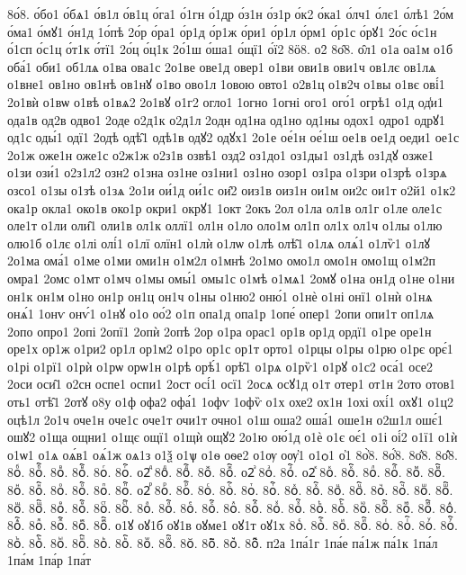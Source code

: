 {8о́8.
о́бо1
о́бѧ1
о́в1л
о́в1ц
о́га1
о́1гн
о́1др
о́з1н
о́з1р
о́к2
о́ка1
о́лч1
о́лє1
о́лѣ1
2о́м
о́ма1
о́мꙋ1
о́н1д
1о́пѣ
2о́р
о́ра1
о́р1д
о́р1ж
о́ри1
о́р1л
о́рм1
о́р1с
о́рꙋ1
2о́с
о́с1н
о́1сп
о́с1ц
о́т1к
о́тї1
2о́ц
о́ц1к
2о́1ш
о́ша1
о́щї1
о́ї2
8ӧ8.
о2̑
8о̑8.
о̑л1
о1а
оа1м
о1б
оба́1
оби1
об1лѧ
о1ва
ова1с
2о1ве
ове1д
овер1
о1ви
ови1в
ови1ч
ов1лє
ов1лѧ
о1вне1
ов1но
ов1нѣ
ов1нꙋ
о1во
ово1л
1овою
овто1
о2в1ц
о1в2ч
о1вы
о1вє
ові́1
2о1вѝ
о1вѡ
о1вѣ
о1вѧ2
2о1вꙋ
о1г2
огло1
1огно
1огні
ого1
ого́1
огрѣ1
о1д
од̾и1
ода1в
од2в
одво1
2оде
о2д1к
о2д1л
2одн
од1на
од1но
од1ны
одох1
одро1
одрꙋ1
од1с
оды́1
одї1
2одѣ
одѣ̑1
одѣ1в
одꙋ2
одꙋх1
2о1е
ое́1н
ое́1ш
ое1в
ое1д
оеди1
ое1с
2о1ж
оже1н
оже1с
о2ж1ж
о2з1в
озвѣ1
озд2
оз1до1
оз1ды1
оз1дѣ
оз1дꙋ
озже1
о1зи
ози́1
о2з1л2
озн2
о1зна
оз1не
оз1ни1
оз1но
озор1
оз1ра
о1зри
о1зрѣ
о1зрѧ
озсо1
о1зы
о1зѣ
о1зѧ
2о1и
ои́1д
ои́1с
ои̑2
оиз1в
оиз1н
ои1м
ои2с
ои1т
о2й1
о1к2
ока1р
окла1
око1в
око1р
окри1
окрꙋ1
1окт
2окъ
2ол
о1ла
ол1в
ол1г
о1ле
оле1с
оле1т
о1ли
оли̑1
оли1в
ол1к
оллї1
ол1н
о1ло
оло1м
ол1п
ол1х
ол1ч
о1лы
о1лю
олю1б
о1лє
о1лі
олі́1
о1лї
олїн1
о1лѝ
о1лѡ
о1лѣ
олѣ̑1
о1лѧ
олѧ́1
о1лѷ1
о1лꙋ
2о1ма
ома́1
о1ме
о1ми
оми1н
о1м2л
о1мнѣ
2о1мо
омо1л
омо1н
омо1щ
о1м2п
омра1
2омс
о1мт
о1мч
о1мы
омы́1
омы1с
о1мѣ
о1мѧ1
2омꙋ
о1на
он1д
о1не
о1ни
он1к
он1м
о1но
он1р
он1ц
он1ч
о1ны
о1ню2
оню́1
о1нѐ
о1ні
онї1
о1нѝ
о1нѧ
онѧ́1
1онѵ
онѵ́1
о1нꙋ
о1о
оо́2
о1п
опа1д
опа1р
1опе́
опер1
2опи
опи1т
оп1лѧ
2опо
опро1
2опі
2опї1
2опѝ
2опѣ
2ор
о1ра
орас1
ор1в
ор1д
ордї1
о1ре
оре1н
оре1х
ор1ж
о1ри2
ор1л
ор1м2
о1ро
ор1с
ор1т
орто1
о1рцы
о1ры
о1рю
о1рє
орє́1
о1рі
о1рї1
о1рѝ
о1рѡ
орѡ1н
о1рѣ
орѣ́1
орѣ̑1
о1рѧ
о1рѷ1
о1рꙋ
о1с2
оса́1
осе2
2оси
оси̑1
о2сн
оспе1
оспи1
2ост
осі́1
осї1
2осѧ
осꙋ1д
о1т
отер1
от1н
2ото
отов1
оть1
отѣ̑1
2отꙋ
о8у  
о1ф
офа2
офа́1
1офѵ
1офѷ
о1х
охе2
ох1н
1охі
охі́1
охꙋ1
о1ц2
оцѣ1л
2о1ч
оче1н
оче1с
оче1т
очи1т
очно1
о1ш
оша2
оша́1
оше1н
о2ш1л
ошє́1
ошꙋ2
о1ща
ощни1
о1щє
ощї1
о1щѝ
ощꙋ2
2о1ю
ою́1д
о1ѐ
о1є
оє́1
о1і
оі́2
о1ї1
о1ѝ
о1ѡ1
о1ѧ
оѧ́в1
оѧ́1ж
оѧ1з
о1ѯ
о1ѱ
о1ѳ
оѳе2
о1ѹ
оѹ҆1
о1ѻ1
о҆1
8о҆̀8.
8о҆́8.
8о҆̈8.
8о҆̑8.
8оⷠ.
8оⷠ҇.
8оⷡ.
8оⷡ҇.
8оⷢ.
8оⷢ҇.
о2ⷣ
8оⷣ.
8оⷣ҇.
8оⷤ.
8оⷤ҇.
о2ⷥ
8оⷥ.
8оⷥ҇.
о2ⷦ
8оⷦ.
8оⷦ҇.
8оⷧ.
8оⷧ҇.
8оⷨ.
8оⷨ҇.
8оⷩ.
8оⷩ҇.
8оⷪ.
8оⷪ҇.
8оⷫ.
8оⷫ҇.
о2ⷬ
8оⷬ.
8оⷬ҇.
8оⷭ.
8оⷭ҇.
8оⷮ.
8оⷮ҇.
8оⷯ.
8оⷯ҇.
8оⷰ.
8оⷰ҇.
8оⷱ.
8оⷱ҇.
8оⷲ.
8оⷲ҇.
8оⷳ.
8оⷳ҇.
8оⷴ.
8оⷴ҇.
8оⷵ.
8оⷵ҇.
8оⷶ.
8оⷶ҇.
8оⷷ.
8оⷷ҇.
8оⷸ.
8оⷸ҇.
8оⷹ.
8оⷹ҇.
8оⷺ.
8оⷺ҇.
8оⷻ.
8оⷻ҇.
8оⷼ.
8оⷼ҇.
8оⷽ.
8оⷽ҇.
8оⷾ.
8оⷾ҇.
8оⷿ.
8оⷿ҇.
о1ꙋ
оꙋ1б
оꙋ1в
оꙋме1
оꙋ1т
оꙋ1х
8оꙴ.
8оꙴ҇.
8оꙵ.
8оꙵ҇.
8оꙶ.
8оꙶ҇.
8оꙷ.
8оꙷ҇.
8оꙸ.
8оꙸ҇.
8оꙹ.
8оꙹ҇.
8оꙺ.
8оꙺ҇.
8оꙻ.
8оꙻ҇.
8о꙼.
8о꙼҇.
8о꙽.
8о꙽҇.
п2а
1па́1г
1па́е
па́1ж
па́1к
1па́л
1па́м
1па́р
1па́т
}
